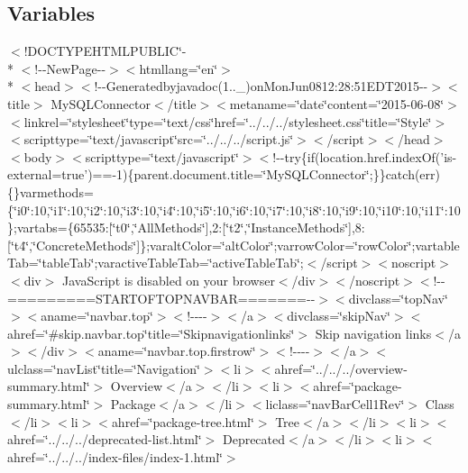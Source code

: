 \subsection*{Variables}
\begin{DoxyCompactItemize}
\item 
$<$!D\-O\-C\-T\-Y\-P\-E\-H\-T\-M\-L\-P\-U\-B\-L\-I\-C\char`\"{}-\/\\*
$<$!-\/-\/New\-Page-\/-\/$>$$<$htmllang=\char`\"{}en\char`\"{}$>$\\*
$<$head$>$$<$!-\/-\/Generatedbyjavadoc(1..\-\_)on\-Mon\-Jun0812\-:28\-:51\-E\-D\-T2015-\/-\/$>$$<$title$>$ My\-S\-Q\-L\-Connector$<$/title$>$$<$metaname=\char`\"{}date\char`\"{}content=\char`\"{}2015-\/06-\/08\char`\"{}$>$$<$linkrel=\char`\"{}stylesheet\char`\"{}type=\char`\"{}text/css\char`\"{}href=\char`\"{}../../../stylesheet.\-css\char`\"{}title=\char`\"{}\-Style\char`\"{}$>$$<$scripttype=\char`\"{}text/javascript\char`\"{}src=\char`\"{}../../../script.\-js\char`\"{}$>$$<$/script$>$$<$/head$>$$<$body$>$$<$scripttype=\char`\"{}text/javascript\char`\"{}$>$$<$!-\/-\/try\{if(location.\-href.\-index\-Of('is-\/external=true')==-\/1)\{parent.\-document.\-title=\char`\"{}\-My\-S\-Q\-L\-Connector\char`\"{};\}\}catch(err)\{\}varmethods=\{\char`\"{}i0\char`\"{}\-:10,\char`\"{}i1\char`\"{}\-:10,\char`\"{}i2\char`\"{}\-:10,\char`\"{}i3\char`\"{}\-:10,\char`\"{}i4\char`\"{}\-:10,\char`\"{}i5\char`\"{}\-:10,\char`\"{}i6\char`\"{}\-:10,\char`\"{}i7\char`\"{}\-:10,\char`\"{}i8\char`\"{}\-:10,\char`\"{}i9\char`\"{}\-:10,\char`\"{}i10\char`\"{}\-:10,\char`\"{}i11\char`\"{}\-:10\};vartabs=\{65535\-:\mbox{[}\char`\"{}t0\char`\"{},\char`\"{}\-All\-Methods\char`\"{}\mbox{]},2\-:\mbox{[}\char`\"{}t2\char`\"{},\char`\"{}\-Instance\-Methods\char`\"{}\mbox{]},8\-:\mbox{[}\char`\"{}t4\char`\"{},\char`\"{}\-Concrete\-Methods\char`\"{}\mbox{]}\};varalt\-Color=\char`\"{}alt\-Color\char`\"{};varrow\-Color=\char`\"{}row\-Color\char`\"{};vartable\-Tab=\char`\"{}table\-Tab\char`\"{};varactive\-Table\-Tab=\char`\"{}active\-Table\-Tab\char`\"{};$<$/script$>$$<$noscript$>$$<$div$>$ Java\-Script is disabled on your browser$<$/div$>$$<$/noscript$>$$<$!-\/-\/=========\-S\-T\-A\-R\-T\-O\-F\-T\-O\-P\-N\-A\-V\-B\-A\-R=======-\/-\/$>$$<$divclass=\char`\"{}top\-Nav\char`\"{}$>$$<$aname=\char`\"{}navbar.\-top\char`\"{}$>$$<$!-\/-\/-\/-\/$>$$<$/a$>$$<$divclass=\char`\"{}skip\-Nav\char`\"{}$>$$<$ahref=\char`\"{}\#skip.\-navbar.\-top\char`\"{}title=\char`\"{}\-Skipnavigationlinks\char`\"{}$>$ Skip navigation links$<$/a$>$$<$/div$>$$<$aname=\char`\"{}navbar.\-top.\-firstrow\char`\"{}$>$$<$!-\/-\/-\/-\/$>$$<$/a$>$$<$ulclass=\char`\"{}nav\-List\char`\"{}title=\char`\"{}\-Navigation\char`\"{}$>$$<$li$>$$<$ahref=\char`\"{}../../../overview-\/summary.\-html\char`\"{}$>$ Overview$<$/a$>$$<$/li$>$$<$li$>$$<$ahref=\char`\"{}package-\/summary.\-html\char`\"{}$>$ Package$<$/a$>$$<$/li$>$$<$liclass=\char`\"{}nav\-Bar\-Cell1\-Rev\char`\"{}$>$ Class$<$/li$>$$<$li$>$$<$ahref=\char`\"{}package-\/tree.\-html\char`\"{}$>$ Tree$<$/a$>$$<$/li$>$$<$li$>$$<$ahref=\char`\"{}../../../deprecated-\/list.\-html\char`\"{}$>$ Deprecated$<$/a$>$$<$/li$>$$<$li$>$$<$ahref=\char`\"{}../../../index-\/files/index-\/1.\-html\char`\"{}$>$ $$
\end{DoxyCompactItemize}
